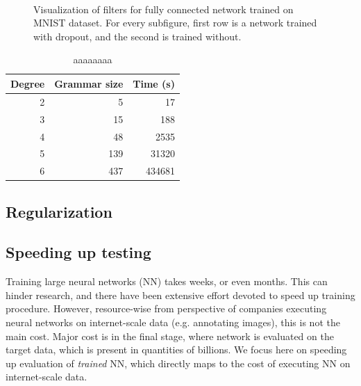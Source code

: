 \documentclass{article}
\begin{document}
\begin{figure}[h]
\centering
  \
  
\caption{Visualization of filters for fully connected network trained on MNIST dataset. For every subfigure, first 
	 row is a network trained with dropout, and the second is trained without.}
\label{filters_mnist}
\end{figure}

\begin{table}
\tiny
\centering
\begin{tabular}{rrr}
\hline
Degree & Grammar size & Time (s) \\
\hline
2 & 5 & 17 \\
3 & 15 & 188 \\
4 & 48 & 2535\\
5 & 139 & 31320 \\
6 & 437 & 434681 \\
\hline
\end{tabular}
\caption{aaaaaaaa}
\label{overfit}
\end{table}



\subsection{Regularization}

\subsection{Speeding up testing}
Training large neural networks (NN) takes weeks, or even months. This can hinder 
research, and there have been extensive effort devoted to speed up training procedure.
However, resource-wise from perspective of companies executing neural networks on internet-scale
data (e.g. annotating images), this is not the main cost. Major cost is in the 
final stage, where network is evaluated on the target data, which is present in quantities of billions.
We focus here on speeding up evaluation of \emph{trained} NN, which directly
maps to the cost of executing NN on internet-scale data. 
\end{document}
